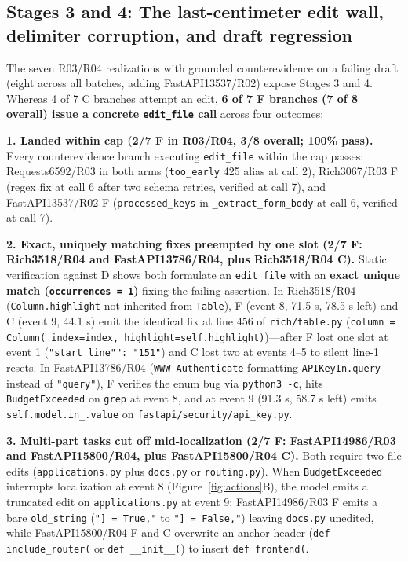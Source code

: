 \subsection{Stages 3 and 4: The last-centimeter edit wall, delimiter corruption, and draft regression}
The seven R03/R04 realizations with grounded counterevidence on a failing draft (eight across all batches, adding FastAPI13537/R02) expose Stages 3 and 4. Whereas 4 of 7 C branches attempt an edit, \textbf{6 of 7 F branches (7 of 8 overall) issue a concrete \texttt{edit\_file} call} across four outcomes:

\textbf{1. Landed within cap (2/7 F in R03/R04, 3/8 overall; 100\% pass).} Every counterevidence branch executing \texttt{edit\_file} within the cap passes: Requests6592/R03 in both arms (\texttt{too\_early} 425 alias at call 2), Rich3067/R03 F (regex fix at call 6 after two schema retries, verified at call 7), and FastAPI13537/R02 F (\texttt{processed\_keys} in \texttt{\_extract\_form\_body} at call 6, verified at call 7).

\textbf{2. Exact, uniquely matching fixes preempted by one slot (2/7 F: Rich3518/R04 and FastAPI13786/R04, plus Rich3518/R04 C).} Static verification against D shows both formulate an \texttt{edit\_file} with an \textbf{exact unique match (\texttt{occurrences = 1})} fixing the failing assertion. In Rich3518/R04 (\texttt{Column.highlight} not inherited from \texttt{Table}), F (event 8, 71.5 s, 78.5 s left) and C (event 9, 44.1 s) emit the identical fix at line 456 of \texttt{rich/table.py} (\texttt{column = Column(\_index=index, highlight=self.highlight)})---after F lost one slot at event 1 (\texttt{"start\_line"": "151"}) and C lost two at events 4--5 to silent line-1 resets. In FastAPI13786/R04 (\texttt{WWW-Authenticate} formatting \texttt{APIKeyIn.query} instead of \texttt{"query"}), F verifies the enum bug via \texttt{python3 -c}, hits \texttt{BudgetExceeded} on \texttt{grep} at event 8, and at event 9 (91.3 s, 58.7 s left) emits \texttt{self.model.in\_.value} on \texttt{fastapi/security/api\_key.py}.

\textbf{3. Multi-part tasks cut off mid-localization (2/7 F: FastAPI14986/R03 and FastAPI15800/R04, plus FastAPI15800/R04 C).} Both require two-file edits (\texttt{applications.py} plus \texttt{docs.py} or \texttt{routing.py}). When \texttt{BudgetExceeded} interrupts localization at event 8 (Figure~\ref{fig:actions}B), the model emits a truncated edit on \texttt{applications.py} at event 9: FastAPI14986/R03 F emits a bare \texttt{old\_string} (\texttt{"] = True,"} to \texttt{"] = False,"}) leaving \texttt{docs.py} unedited, while FastAPI15800/R04 F and C overwrite an anchor header (\texttt{def include\_router(} or \texttt{def \_\_init\_\_(}) to insert \texttt{def frontend(}.

